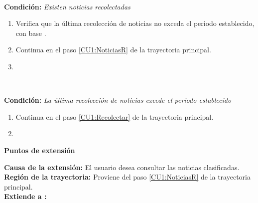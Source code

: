 \begin{large}
	\\
\end{large}	
\textbf{Condición:} \textit{Existen noticias recolectadas}

\begin{enumerate}[{A-}1.]

	\item \sistema Verifica que la última recolección de noticias no exceda el periodo establecido, con base .

	\item \actor Continua en el paso \ref{CU1:NoticiasR} de la trayectoria principal.

	\item \finTA

\end{enumerate}

\begin{large}
	\\
\end{large}	
\textbf{Condición:} \textit{La última recolección de noticias excede el periodo establecido}

\begin{enumerate}[{B-}1.]

	\item \actor Continua en el paso \ref{CU1:Recolectar} de la trayectoria principal.

	\item \finTA

\end{enumerate}




\begin{large}
	\textbf{Puntos de extensión}\\
\end{large}	

\textbf{Causa de la extensión:} El usuario desea consultar las noticias clasificadas.\\
\textbf{Región de la trayectoria:} Proviene del paso \ref{CU1:NoticiasR} de la trayectoria principal.\\
\textbf{Extiende a :} \\\\


